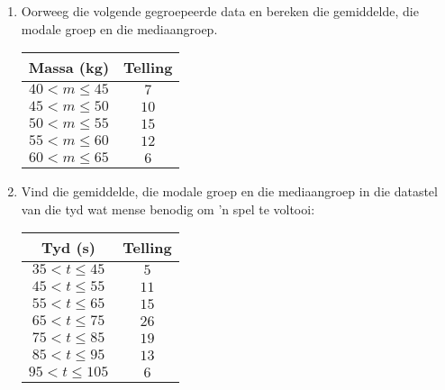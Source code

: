 \begin{exercises}{}{
  \begin{enumerate}[itemsep=8pt, label=\textbf{\arabic*}.]

  \item Oorweeg die volgende gegroepeerde data en bereken die gemiddelde, die modale groep en die mediaangroep.
\\
    \begin{center}
      \begin{tabular}{|c|c|}\hline
      
        \textbf{Massa (kg)} & \textbf{Telling} \\\hline
     
        $40 < m \leq 45$ & $7$ \\\hline
        $45 < m \leq 50$ & $10$ \\\hline
        $50 < m \leq 55$ & $15$ \\\hline
        $55 < m \leq 60$ & $12$ \\\hline
        $60 < m \leq 65$ & $6$ \\\hline
  
      \end{tabular}
    \end{center}

  \item Vind die gemiddelde, die modale groep en die mediaangroep in die datastel van die tyd wat mense benodig om ’n spel te voltooi:
\\
    \begin{center}
      \begin{tabular}{|c|c|} \hline

       \textbf{Tyd (s)} & \textbf{Telling} \\ \hline

        $35 < t \leq 45$ & $5$ \\\hline
        $45 < t \leq 55$ & $11$ \\\hline
        $55 < t \leq 65$ & $15$ \\\hline
        $65 < t \leq 75$ & $26$ \\\hline
        $75 < t \leq 85$ & $19$ \\\hline
        $85 < t \leq 95$ & $13$ \\\hline
        $95 < t \leq 105$ & $6$ \\\hline


\end{tabular}
\end{center}
\end{enumerate}}
\end{exercises}
